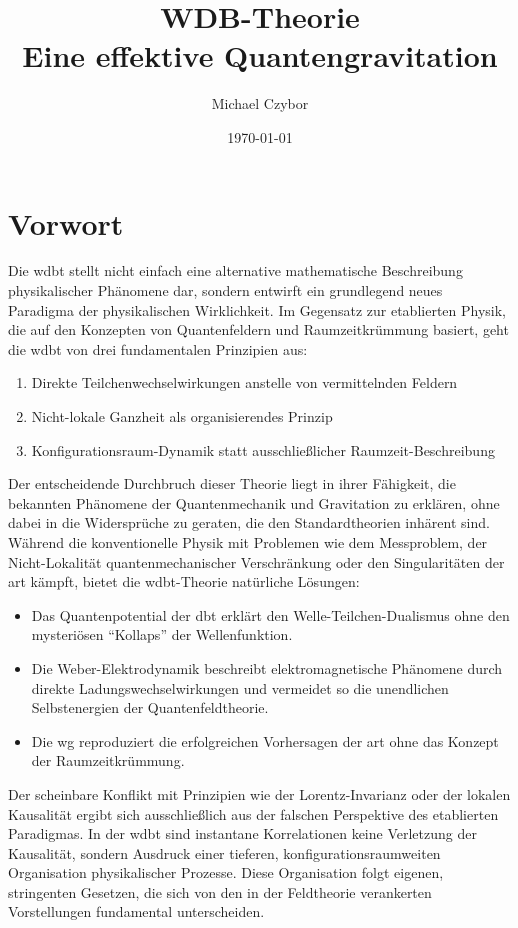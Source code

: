 \documentclass[11pt, a4paper, twoside, openright]{book}
\begin{document}
\frontmatter
\title{WDB-Theorie\\Eine effektive Quantengravitation}
\author{Michael Czybor}
\date{\today}
\maketitle

\chapter*{Vorwort}
Die \gls{wdbt} stellt nicht einfach eine alternative mathematische Beschreibung physikalischer Phänomene dar, sondern entwirft ein grundlegend neues Paradigma der physikalischen Wirklichkeit.
Im Gegensatz zur etablierten Physik, die auf den Konzepten von Quantenfeldern und Raumzeitkrümmung basiert, geht die \gls{wdbt} von drei fundamentalen Prinzipien aus:
\begin{enumerate}
    \item Direkte Teilchenwechselwirkungen anstelle von vermittelnden Feldern
    \item Nicht-lokale Ganzheit als organisierendes Prinzip
    \item Konfigurationsraum-Dynamik statt ausschließlicher Raumzeit-Beschreibung
\end{enumerate}
Der entscheidende Durchbruch dieser Theorie liegt in ihrer Fähigkeit, die bekannten Phänomene der Quantenmechanik und Gravitation zu erklären, ohne dabei in die Widersprüche zu geraten,
die den Standardtheorien inhärent sind. Während die konventionelle Physik mit Problemen wie dem Messproblem, der Nicht-Lokalität quantenmechanischer Verschränkung oder den Singularitäten
der \gls{art} kämpft, bietet die \gls{wdbt}-Theorie natürliche Lösungen:
\begin{itemize}
    \item Das Quantenpotential der \gls{dbt} erklärt den Welle-Teilchen-Dualismus ohne den mysteriösen \enquote{Kollaps} der Wellenfunktion.
    \item Die Weber-Elektrodynamik beschreibt elektromagnetische Phänomene durch direkte Ladungswechselwirkungen und vermeidet so die unendlichen Selbstenergien der Quantenfeldtheorie.
    \item Die \gls{wg} reproduziert die erfolgreichen Vorhersagen der \gls{art} ohne das Konzept der Raumzeitkrümmung.
\end{itemize}
Der scheinbare Konflikt mit Prinzipien wie der Lorentz-Invarianz oder der lokalen Kausalität ergibt sich ausschließlich aus der falschen Perspektive des etablierten Paradigmas.
In der \gls{wdbt} sind instantane Korrelationen keine Verletzung der Kausalität, sondern Ausdruck einer tieferen, konfigurationsraumweiten Organisation physikalischer Prozesse.
Diese Organisation folgt eigenen, stringenten Gesetzen, die sich von den in der Feldtheorie verankerten Vorstellungen fundamental unterscheiden.
\end{document}
